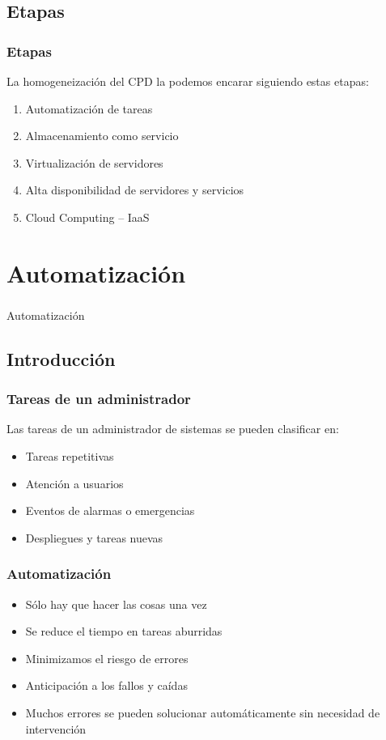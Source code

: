 \documentclass{beamer}
\begin{document}
\subsection{Etapas}
\begin{frame}
  \frametitle{Etapas}
  La homogeneización del CPD la podemos encarar siguiendo estas etapas:
  \begin{enumerate}
    \item Automatización de tareas
    \pause
    \item Almacenamiento como servicio
    \pause
    \item Virtualización de servidores
    \pause
    \item Alta disponibilidad de servidores y servicios
    \pause
    \item Cloud Computing -- IaaS
  \end{enumerate}
\end{frame}


\section{Automatización}
\begin{frame}
  \frametitle{}
  \begin{center}
    \Huge Automatización
  \end{center}
\end{frame}

\subsection{Introducción}
\begin{frame}
  \frametitle{Tareas de un administrador}
  Las tareas de un administrador de sistemas se pueden clasificar en:
  \begin{itemize}
    \item Tareas repetitivas
    \item Atención a usuarios
    \item Eventos de alarmas o emergencias
    \item Despliegues y tareas nuevas
  \end{itemize}
\end{frame}

\begin{frame}
  \frametitle{Automatización}
  \begin{itemize}
    \item Sólo hay que hacer las cosas una vez
    \item Se reduce el tiempo en tareas aburridas
    \item Minimizamos el riesgo de errores
    \item Anticipación a los fallos y caídas
    \item Muchos errores se pueden solucionar automáticamente sin necesidad de intervención
  \end{itemize}
\end{frame}
\end{document}
